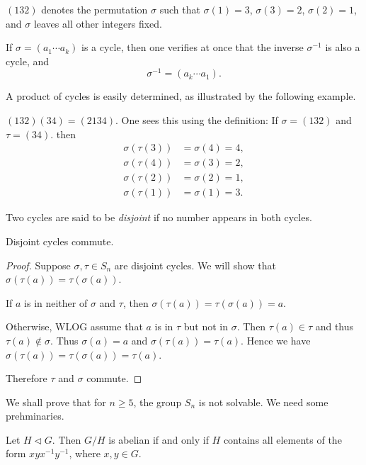 \begin{example}
$(132)$ denotes the permutation $\sigma$ such that $\sigma(1)=3$, $\sigma(3)=2$, $\sigma(2)=1$, and $\sigma$ leaves all other integers fixed.
\end{example}

If $\sigma=(a_1\cdots a_k)$ is a cycle, then one verifies at once that the inverse $\sigma^{-1}$ is also a cycle, and 
\[\sigma^{-1}=(a_k\cdots a_1).\]

A product of cycles is easily determined, as illustrated by the following example.

\begin{example}
$(132)(34)=(2134)$. One sees this using the definition: If $\sigma=(132)$ and $\tau=(34)$. then
\begin{align*}
\sigma(\tau(3))&=\sigma(4)=4,\\
\sigma(\tau(4))&=\sigma(3)=2,\\
\sigma(\tau(2))&=\sigma(2)=1,\\
\sigma(\tau(1))&=\sigma(1)=3.
\end{align*}
\end{example}

Two cycles are said to be \emph{disjoint} if no number appears in both cycles.

\begin{lemma}
Disjoint cycles commute.
\end{lemma}

\begin{proof}
Suppose $\sigma,\tau\in S_n$ are disjoint cycles. We will show that $\sigma(\tau(a))=\tau(\sigma(a))$. 

If $a$ is in neither of $\sigma$ and $\tau$, then $\sigma(\tau(a))=\tau(\sigma(a))=a$. 

Otherwise, WLOG assume that $a$ is in $\tau$ but not in $\sigma$. Then $\tau(a)\in\tau$ and thus $\tau(a)\notin\sigma$. Thus $\sigma(a)=a$ and $\sigma(\tau(a))=\tau(a)$. Hence we have $\sigma(\tau(a))=\tau(\sigma(a))=\tau(a)$.

Therefore $\tau$ and $\sigma$ commute.
\end{proof}

We shall prove that for $n\ge 5$, the group $S_n$ is not solvable. We need some prehminaries. 

\begin{lemma*}
Let $H\triangleleft G$. Then $G/H$ is abelian if and only if $H$ contains all elements of the form $xyx^{-1}y^{-1}$, where $x,y\in G$. 
\end{lemma*}

